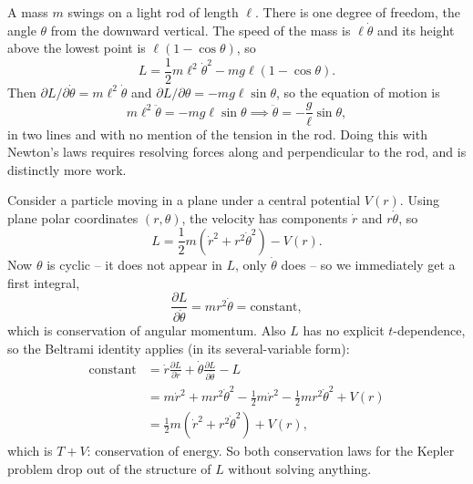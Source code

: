 \begin{example}
	A mass $m$ swings on a light rod of length $\ell$. There is one degree of freedom, the angle $\theta$ from the downward vertical. The speed of the mass is $\ell\dot\theta$ and its height above the lowest point is $\ell(1 - \cos\theta)$, so
	$$
	L = \frac{1}{2}m\ell^2\dot\theta^2 - mg\ell(1 - \cos\theta).
	$$
	Then $\partial L/\partial \dot\theta = m\ell^2\dot\theta$ and $\partial L/\partial\theta = -mg\ell\sin\theta$, so the equation of motion is
	$$
	m\ell^2\ddot\theta = -mg\ell\sin\theta \implies \ddot\theta = -\frac{g}{\ell}\sin\theta,
	$$
	in two lines and with no mention of the tension in the rod. Doing this with Newton's laws requires resolving forces along and perpendicular to the rod, and is distinctly more work.
\end{example}

\begin{example}
	Consider a particle moving in a plane under a central potential $V(r)$. Using plane polar coordinates $(r, \theta)$, the velocity has components $\dot r$ and $r\dot\theta$, so
	$$
	L = \frac{1}{2}m\left(\dot r^2 + r^2\dot\theta^2\right) - V(r).
	$$
	Now $\theta$ is cyclic -- it does not appear in $L$, only $\dot\theta$ does -- so we immediately get a first integral,
	$$
	\frac{\partial L}{\partial \dot\theta} = m r^2\dot\theta = \text{constant},
	$$
	which is conservation of angular momentum. Also $L$ has no explicit $t$-dependence, so the Beltrami identity applies (in its several-variable form):
	\begin{align*}
		\text{constant} &= \dot r \frac{\partial L}{\partial \dot r} + \dot\theta\frac{\partial L}{\partial \dot\theta} - L \\
		&= m\dot r^2 + mr^2\dot\theta^2 - \frac12 m \dot r^2 - \frac12 mr^2\dot\theta^2 + V(r) \\
		&= \frac{1}{2}m\left(\dot r^2 + r^2\dot\theta^2\right) + V(r),
	\end{align*}
	which is $T + V$: conservation of energy. So both conservation laws for the Kepler problem drop out of the structure of $L$ without solving anything.
\end{example}

